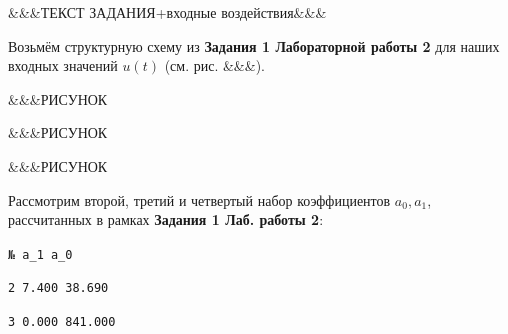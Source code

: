 
\begin{par}
\begin{flushleft}
\&\&\&ТЕКСТ ЗАДАНИЯ+входные воздействия\&\&\&
\end{flushleft}
\end{par}

\begin{par}
\begin{flushleft}
Возьмём структурную схему из \textbf{Задания 1 Лабораторной работы 2} для наших входных значений  $u(t)$ (см. рис. \&\&\&). 
\end{flushleft}
\end{par}

\begin{par}
\begin{flushleft}
\&\&\&РИСУНОК
\end{flushleft}
\end{par}

\begin{par}
\begin{flushleft}
\&\&\&РИСУНОК
\end{flushleft}
\end{par}

\begin{par}
\begin{flushleft}
\&\&\&РИСУНОК
\end{flushleft}
\end{par}

\begin{par}
\begin{flushleft}
Рассмотрим второй, третий и четвертый набор коэффициентов $a_0 ,a_1$, рассчитанных в рамках \textbf{Задания 1 Лаб. работы 2}:
\end{flushleft}
\end{par}

\begin{par}
\begin{flushleft}
\texttt{№  a\_1		 a\_0}
\end{flushleft}
\end{par}

\begin{par}
\begin{flushleft}
\texttt{2   7.400	 38.690}
\end{flushleft}
\end{par}

\begin{par}
\begin{flushleft}
\texttt{3   0.000	841.000}
\end{flushleft}
\end{par}

